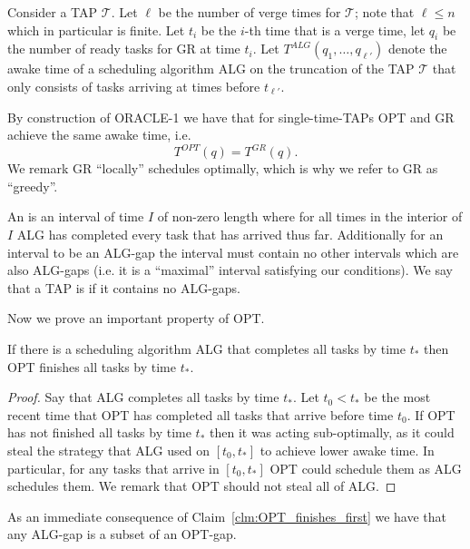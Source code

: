 Consider a TAP $\mathcal{T}$. Let $\ell$ be the number of verge
times for $\mathcal{T}$; note that $\ell \le n$ which in
particular is finite. Let $t_i$ be the $i$-th time that is a
verge time, let $q_i$ be the number of ready tasks for GR at
time $t_i$. Let $T^{ALG}(q_1, \ldots, q_{\ell'})$ denote the
awake time of a scheduling algorithm ALG on the truncation of the
TAP $\mathcal{T}$ that only consists of tasks arriving at times
before $t_{\ell'}$.

By construction of ORACLE-1 we have that for single-time-TAPs OPT
and GR achieve the same awake time, i.e.
\begin{equation}
  \label{eq:same_single}
  T^{OPT}(q) = T^{GR}(q).
\end{equation}
We remark GR \enquote{locally} schedules optimally, which is why
we refer to GR as \enquote{greedy}. 

An  is an interval of time $I$ of non-zero length where for
all times in the interior of $I$ ALG has completed every
task that has arrived thus far. Additionally for an interval to
be an ALG-gap the interval must contain no other intervals which
are also ALG-gaps (i.e. it is a \enquote{maximal} interval
satisfying our conditions).
We say that a TAP is  if it contains no ALG-gaps.

Now we prove an important property of OPT.
\begin{claim}
  \label{clm:OPT_finishes_first}
  If there is a scheduling algorithm ALG that completes all tasks by
  time $t_*$ then OPT finishes all tasks by time $t_*$.
\end{claim}
\begin{proof}
  Say that ALG completes all tasks by time $t_*$. Let $t_0 < t_*$
  be the most recent time that OPT has completed all tasks that
  arrive before time $t_0$. If OPT has not finished all tasks by
  time $t_*$ then it was acting sub-optimally, as it could steal
  the strategy that ALG used on $[t_0, t_*]$ to achieve lower
  awake time. In particular, for any tasks that arrive in $[t_0,
  t_*]$ OPT could schedule them as ALG schedules them. We remark
  that OPT should not steal all of ALG. 
\end{proof}
As an immediate consequence of Claim~\ref{clm:OPT_finishes_first}
we have that any ALG-gap is a subset of an OPT-gap.

